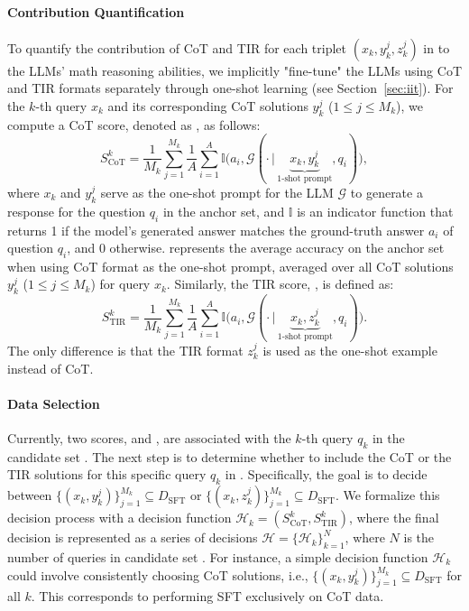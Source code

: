 \paragraph{Contribution Quantification}
To quantify the contribution of CoT and TIR for each triplet $(x_k, y_k^j, z_k^j)$ in {\dd} to the LLMs' math reasoning abilities, we implicitly "fine-tune" the LLMs using CoT and TIR formats separately through one-shot learning (see Section~\ref{sec:iit}). 
For the $k$-th query $x_k$ and its corresponding CoT solutions $y_k^j$ ($1 \leq j \leq M_k$), we compute a CoT score, denoted as {\scote}, as follows:
{\small
\begin{equation*}
S_{\text{CoT}}^k = \frac{1}{M_k} \sum_{j=1}^{M_k} \frac{1}{A} \sum_{i=1}^A  \mathbb{I} \big(a_i, \mathcal{G}(\cdot \,|\, \underbrace{x_k, y_k^j}_{\text{1-shot prompt}}, q_i)\big),
\end{equation*}
}
where $x_k$ and $y_k^j$ serve as the one-shot prompt for the LLM $\mathcal{G}$ to generate a response for the question $q_i$ in the anchor set, and $\mathbb{I}$ is an indicator function that returns 1 if the model’s generated answer matches the ground-truth answer $a_i$ of question $q_i$, and 0 otherwise. 
{\scote} represents the average accuracy on the anchor set {\danchor} when using CoT format as the one-shot prompt, averaged over all CoT solutions $y_k^j$ ($1 \leq j \leq M_k$) for query $x_k$. 
Similarly, the TIR score, {\stire}, is defined as:
{\small
\begin{equation*}
S_{\text{TIR}}^k = \frac{1}{M_k} \sum_{j=1}^{M_k} \frac{1}{A} \sum_{i=1}^A  \mathbb{I} \big(a_i, \mathcal{G}(\cdot \,|\, \underbrace{x_k, z_k^j}_{\text{1-shot prompt}}, q_i)\big).
\end{equation*}
}
The only difference is that the TIR format $z_k^j$ is used as the one-shot example instead of CoT.

\paragraph{Data Selection}
Currently, two scores, {\scote} and {\stire}, are associated with the $k$-th query $q_k$ in the candidate set {\dd}.
The next step is to determine whether to include the CoT or the TIR solutions for this specific query $q_k$ in {\dd}. 
Specifically, the goal is to decide between $\{(x_k, y_k^j)\}_{j=1}^{M_k} \subseteq D_{\text{SFT}}$ or $\{(x_k, z_k^j)\}_{j=1}^{M_k} \subseteq D_{\text{SFT}}$. 
We formalize this decision process with a decision function $\mathcal{H}_k = (S_{\text{CoT}}^k, S_{\text{TIR}}^k)$, where the final decision is represented as a series of decisions $\mathcal{H} = \{\mathcal{H}_k\}_{k=1}^N$, where $N$ is the number of queries in candidate set {\dd}. 
For instance, a simple decision function $\mathcal{H}_k$ could involve consistently choosing CoT solutions, i.e., $\{(x_k, y_k^j)\}_{j=1}^{M_k} \subseteq D_{\text{SFT}}$ for all $k$. 
This corresponds to performing SFT exclusively on CoT data.
